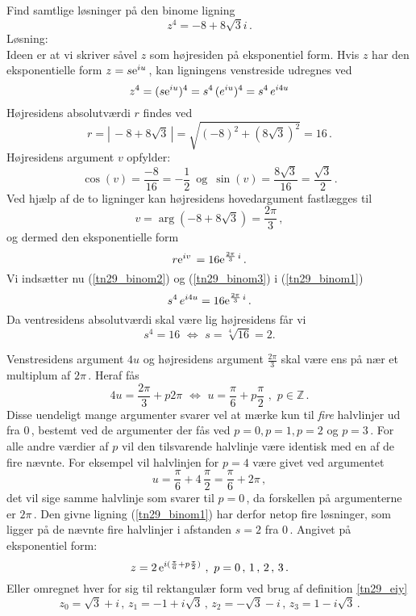 \begin{example}\label{tn29_binom}
Find samtlige løsninger på den binome ligning
\begin{equation}\label{tn29_binom1}
z^4=-8+8\sqrt 3 i\,.
\end{equation}
Løsning:\\
Ideen er at vi skriver såvel $z$ som højresiden på eksponentiel form.\bs 
Hvis $z$ har den eksponentielle form $z=s\mathrm{e}^{iu}\,$, kan ligningens venstreside udregnes ved 
\begin{equation}\label{tn29_binom2}
z^4=(s\mathrm{e}^{iu})^4=s^4\,(e^{iu})^4=s^4\,e^{i4u}
\end{equation}
Højresidens absolutværdi $r$ findes ved
$$r=|\,-8+8\sqrt 3\,|=\sqrt{(-8)^2+(8\sqrt 3)^2}=16\,.$$
Højresidens argument $v$ opfylder:
$$\cos(v)=\frac{-8}{16}=-\frac{1}{2}\,\,\,\mathrm{og}\,\,\,
\sin(v)=\frac{8\sqrt 3} {16}=\frac{\sqrt 3}{2}\,.$$
Ved hjælp af de to ligninger kan højresidens hovedargument fastlægges til 
$$v=\arg(-8+8\sqrt 3)=\frac {2\pi}3\,,$$
og dermed den eksponentielle form
\begin{equation}\label{tn29_binom3}
r\mathrm{e}^{iv}\,=16\mathrm{e}^{\frac {2\pi}3\,i}\,.
\end{equation}
Vi indsætter nu (\ref{tn29_binom2}) og (\ref{tn29_binom3}) i (\ref{tn29_binom1})
$$
s^4\,e^{i4u}=16\mathrm{e}^{\frac {2\pi}3\,i}\,.
$$
Da ventresidens absolutværdi skal være lig højresidens får vi
$$
s^4=16\,\,\Leftrightarrow\,\, s=\sqrt[4]{16}=2.
$$

Venstresidens argument $4u$ og højresidens argument $\frac {2\pi}3$ skal være ens på nær et multiplum af $2\pi\,$. Heraf fås
$$4u=\frac {2\pi}3+p2\pi\,\,
\Leftrightarrow\,\, u =\frac {\pi}6 +p\frac {\pi}2 \,\,,\,\,p\in \mathbb Z\,.
$$
Disse uendeligt mange argumenter svarer vel at mærke kun til \textit{fire} halvlinjer ud fra $0\,$, bestemt ved de argumenter der fås ved $p=0,p=1,p=2$ og $p=3\,$. For alle andre værdier af $p$ vil den tilsvarende halvlinje være identisk med en af de fire nævnte. For eksempel vil halvlinjen for $p=4$ være givet ved argumentet
$$u=\frac {\pi}6 +4\,\frac{\pi}2=\frac {\pi}6+2\pi\,,$$
det vil sige samme halvlinje som svarer til $p=0\,$, da forskellen på argumenterne er $2\pi\,$.\bs
Den givne ligning (\ref{tn29_binom1}) har derfor netop fire løsninger, som ligger på de nævnte fire halvlinjer i afstanden $s=2$ fra $0\,$. Angivet på  eksponentiel form:
$$z=2\,\mathrm{e}^{i(\frac {\pi}6 +p\frac {\pi}2 )}\,\,,\,\,p=0\,,\,1\,,\,2\,,\,3\,.$$
Eller omregnet hver for sig til rektangulær form ved brug af definition \ref{tn29_eiy}
$$z_0=\sqrt 3+i\,,\,z_1=-1+i\sqrt 3\,,\,z_2=-\sqrt 3-i\,,\,z_3=1-i\sqrt 3\,.$$
\end{example}

